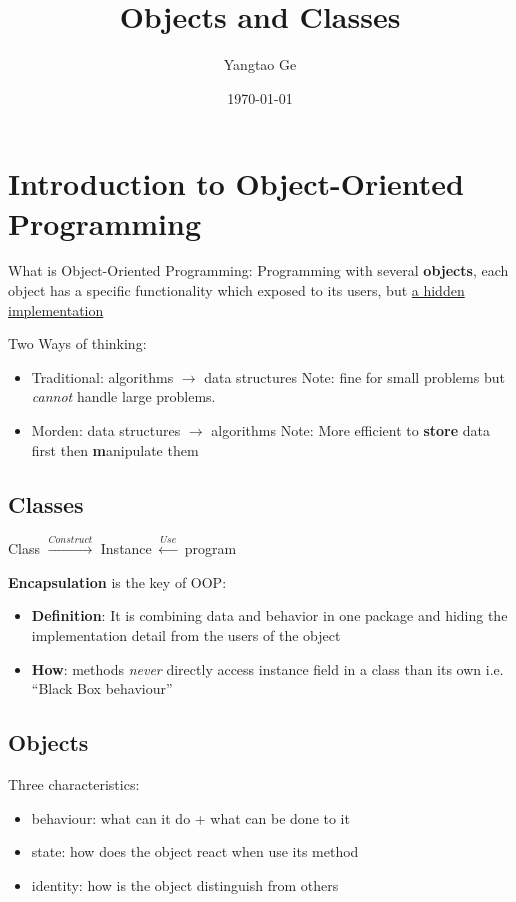 \documentclass[12pt]{article}
\title{Objects and Classes}
\author{Yangtao Ge}
\date{\today}
\begin{document}
\maketitle

\section{Introduction to Object-Oriented Programming}
What is Object-Oriented Programming:\newline
Programming with several \textbf{objects}, each object has a specific functionality
which exposed to its users, but \underline{a hidden implementation}

Two Ways of thinking:
\begin{itemize}
    \item Traditional: algorithms $\rightarrow$ data structures\newline
    Note: fine for small problems but \textit{cannot} handle large problems.
    \item Morden: data structures $\rightarrow$ algorithms\newline
    Note: More efficient to \textbf{store} data first then \textbf manipulate them
\end{itemize}

\subsection{Classes}
Class $\xrightarrow{Construct}$ Instance $\xleftarrow{Use}$ program

\textbf{Encapsulation} is the key of OOP:
\begin{itemize}
\item \textbf{Definition}: It is combining data and behavior in one package and 
hiding the implementation detail from the users of the object
\item \textbf{How}: methods \emph{never} directly access instance field in a class than its own
i.e. ``Black Box behaviour''
\end{itemize}

\subsection{Objects}
Three characteristics:
\begin{itemize}
    \item behaviour:  what can it do + what can be done to it
    \item state: how does the object react when use its method
    \item identity: how is the object distinguish from others
\end{itemize}
\end{document}
